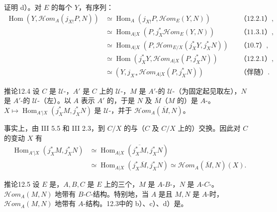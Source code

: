 证明 d）。对 $E$ 的每个 $Y$，有序列：
\begin{align*}
\operatorname{Hom}(Y,\mathscr{H}\!om_A(j_{X!}P,N))
&\simeq\operatorname{Hom}_A(j_{X!}P,\mathscr{H}\!om_E(Y,N))&&\text{（12.2.1）},\\
&\simeq\operatorname{Hom}_{A|X}(P,j_X^*\mathscr{H}\!om_E(Y,N))&&\text{（11.3.1）},\\
&\simeq\operatorname{Hom}_{A|X}(P,\mathscr{H}\!om_{E/X}(j_X^*Y,j_X^*N))&&\text{（10.7）},\\
&\simeq\operatorname{Hom}(j_X^*Y,\mathscr{H}\!om_{A|X}(P,j_X^*N))&&\text{（12.2.1）},\\
&\simeq (Y,j_{X*}\mathscr{H}\!om_{A|X}(P,j_X^*N))&&\text{（伴随）}.
\end{align*}
\begin{SGAresult}{推论}{12.4}
设 $C$ 是 $\mathcal U$-，$A'$ 是 $C$ 上的 $\mathcal U$-，$M$ 是 $A'$-的 $\mathcal U$-（为固定起见取左），$N$ 是 $A'$-的 $\mathcal U$-（左）。以 $A$ 表示 $A'$ 的，于是 $N$ 及 $\overline M$（$M$ 的）是 $A$-。
$X\mapsto\operatorname{Hom}_{A'|X}(j_X^*M,j_X^*N)$ 是 $\mathcal U$-，并于 $\mathscr{H}\!om_A(\overline M,N)$。
\end{SGAresult}
事实上，由 III 5.5 和 III 2.3，到 $C/X$ 的与（$C$ 及 $C/X$ 上的）交换。因此对 $C$ 的变动 $X$ 有
\begin{align*}
\operatorname{Hom}_{A'|X}(j_X^*M,j_X^*N)
&\simeq\operatorname{Hom}_{A|X}(\overline{j_X^*M},j_X^*N)\\
&\simeq\operatorname{Hom}_{A|X}(j_X^*\overline M,j_X^*N)\simeq\mathscr{H}\!om_A(\overline M,N)(X).
\end{align*}
\begin{SGAresult}{推论}{12.5}
设 $E$ 是，$A,B,C$ 是 $E$ 上的三个，$M$ 是 $A$-$B$-，$N$ 是 $A$-$C$-。 $\mathscr{H}\!om_A(M,N)$ 地带有 $B$-$C$-结构。特别地，当 $A$ 是且 $M,N$ 是 $A$-时，$\mathscr{H}\!om_A(M,N)$ 地带有 $A$-结构。12.3中的 b）、c）、d）是。
\end{SGAresult}
